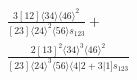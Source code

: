 \documentclass[varwidth, border=5pt]{standalone}
\begin{document}
\begin{my}
$\begin{gathered}
\scriptscriptstyle\frac{3[12]⟨34⟩⟨46⟩^2}{[23]⟨24⟩^2⟨56⟩s_{123}}+\\
\scriptscriptstyle\frac{2[13]^2⟨34⟩^3⟨46⟩^2}{[23]⟨24⟩^3⟨56⟩⟨4|2+3|1]s_{123}}\phantom{+}
\end{gathered}$
\end{my}
\end{document}
